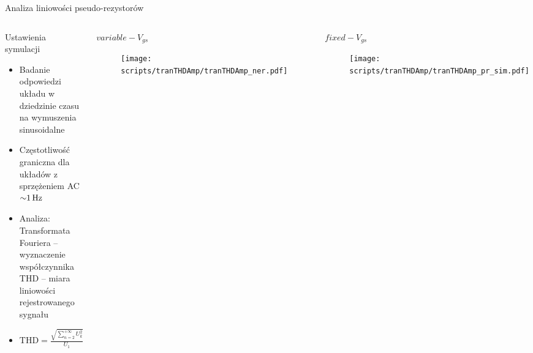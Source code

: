 \begin{frame}{Analiza liniowości pseudo-rezystorów}
    \vspace{-1em}



    \begin{columns}
        \begin{block}{Ustawienia symulacji}
            \begin{itemize}
                \item Badanie odpowiedzi układu  w dziedzinie czasu na wymuszenia sinusoidalne
                \item Częstotliwość graniczna dla układów z sprzężeniem AC $\SI{\sim 1}{\hertz}$
                \item Analiza: Transformata Fouriera -- wyznaczenie współczynnika THD -- miara liniowości rejestrowanego sygnału
                \item $\mathrm{THD} = \frac{\sqrt{\sum_{n=2}^{+\infty} U_k^2}}{U_1}$
            \end{itemize}
                \end{block}
        \vspace{-1em} %
        \begin{alertblock}{$variable-V_{gs}$}
        \begin{figure}[H]
            \centering
            \texttt{[image: scripts/tranTHDAmp/tranTHDAmp\_ner.pdf]}
        \end{figure}
    \end{alertblock}
        \vspace{-1em} %
        \begin{exampleblock}{$fixed-V_{gs}$}
        \begin{figure}[H]
            \centering
            \texttt{[image: scripts/tranTHDAmp/tranTHDAmp\_pr\_sim.pdf]}
        \end{figure}
    \end{exampleblock}
    \end{columns}

\end{frame}




